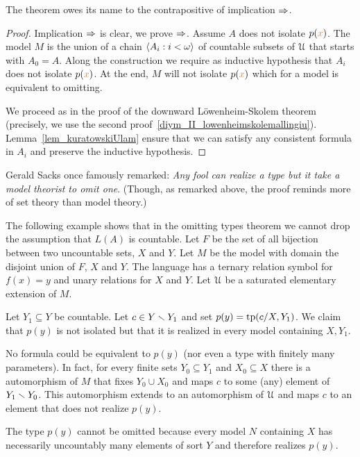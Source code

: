 \documentclass[creche.tex]{subfiles}
\begin{document}
The theorem owes its name to the contrapositive of implication $\Rightarrow$.

\begin{proof}
Implication $\Rightarrow$ is clear, we prove $\Rightarrow$. Assume $A$ does not isolate $p({\color{brown} x})$. The model $M$ is the union of a chain $\langle A_i:i<\omega\rangle$ of countable subsets of $\EuScript U$ that starts with $A_0=A$. Along the construction we require as inductive hypothesis that $A_i$ does not isolate $p({\color{brown} x})$. At the end, $M$ will not isolate $p({\color{brown} x})$ which for a model is equivalent to omitting. 

We proceed as in the proof of the downward L\"owenheim-Skolem theorem (precisely, we use the second proof~\ref{diym_II_lowenheimskolemallingiu}). Lemma~\ref{lem_kuratowskiUlam} ensure that we can satisfy any consistent formula in $A_i$ and preserve the inductive hypothesis.
\end{proof}

Gerald Sacks once famously remarked: \textit{Any fool can realize a type but it take a model theorist to omit one}. (Though, as remarked above, the proof reminds more of set theory than model theory.)



\begin{example}\label{ex_AK}
The following example shows that in the omitting types theorem we cannot drop the assumption that $L(A)$ is countable. Let $F$ be the set of all bijection between two uncountable sets, $X$ and $Y$. Let $M$ be the model with domain the disjoint union of $F$, $X$ and $Y$. The language has a ternary relation symbol for $f(x)=y$ and unary relations for $X$ and $Y$. Let $\EuScript U$ be a saturated elementary extension of $M$.

Let $Y_1\subseteq Y$ be countable. Let $c\in Y\smallsetminus Y_1$ and set $p(y)={\rm tp}(c/X,Y_1)$. We claim that $p(y)$ is not isolated but that it is realized in every model containing $X,Y_1$.

No formula could be equivalent to $p(y)$ (nor even a type with finitely many parameters). In fact, for every finite sets $Y_0\subseteq Y_1$ and $X_0\subseteq X$ there is a automorphism of $M$ that fixes $Y_0\cup X_0$ and maps $c$ to some (any) element of $Y_1\smallsetminus Y_0$. This automorphism extends to an automorphism of $\EuScript U$ and maps $c$ to an element that does not realize $p(y)$.  

The type $p(y)$ cannot be omitted because every model $N$ containing  $X$ has necessarily uncountably many elements of sort $Y$ and therefore realizes $p(y)$.\QED
\end{example}
\end{document}
